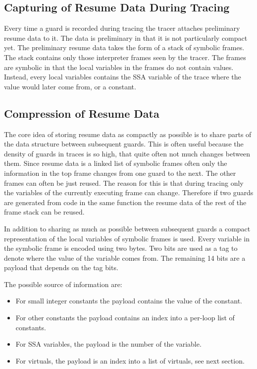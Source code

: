 \documentclass[10pt,preprint]{sigplanconf}
\begin{document}
\subsection{Capturing of Resume Data During Tracing}
\label{sub:capturing}

Every time a guard is recorded during tracing
the tracer attaches preliminary resume data to it.
The data is preliminary in that it is not particularly compact yet.
The preliminary resume data takes the form of a stack of symbolic frames.
The stack contains only those interpreter frames seen by the tracer.
The frames are symbolic in that the local variables in the frames
do not contain values.
Instead, every local variables contains the SSA variable of the trace
where the value would later come from, or a constant.

\subsection{Compression of Resume Data}
\label{sub:compression}

The core idea of storing resume data as compactly as possible
is to share parts of the data structure between subsequent guards.
This is often useful because the density of guards in traces is so high,
that quite often not much changes between them.
Since resume data is a linked list of symbolic frames
often only the information in the top frame changes from one guard to the next.
The other frames can often be just reused.
The reason for this is that during tracing only the variables
of the currently executing frame can change.
Therefore if two guards are generated from code in the same function
the resume data of the rest of the frame stack can be reused.

In addition to sharing as much as possible between subsequent guards
a compact representation of the local variables of symbolic frames is used.
Every variable in the symbolic frame is encoded using two bytes.
Two bits are used as a tag to denote where the value of the variable
comes from.
The remaining 14 bits are a payload that depends on the tag bits.

The possible source of information are:

\begin{itemize}
    \item For small integer constants
        the payload contains the value of the constant.
    \item For other constants
        the payload contains an index into a per-loop list of constants.
    \item For SSA variables,
        the payload is the number of the variable.
    \item For virtuals,
        the payload is an index into a list of virtuals, see next section.
\end{itemize}
\end{document}
